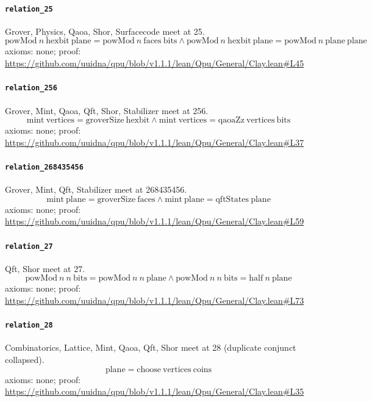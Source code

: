 \documentclass[11pt]{article}
\begin{document}
\paragraph{\texttt{relation\_25}}
Grover, Physics, Qaoa, Shor, Surfacecode meet at 25.
\[ \mathrm{powMod}\ n\ \mathrm{hexbit}\ \mathrm{plane} = \mathrm{powMod}\ n\ \mathrm{faces}\ \mathrm{bits} \land \mathrm{powMod}\ n\ \mathrm{hexbit}\ \mathrm{plane} = \mathrm{powMod}\ n\ \mathrm{plane}\ \mathrm{plane} \]
\noindent axioms: none; proof: \url{https://github.com/uuidna/qpu/blob/v1.1.1/lean/Qpu/General/Clay.lean\#L45}

\paragraph{\texttt{relation\_256}}
Grover, Mint, Qaoa, Qft, Shor, Stabilizer meet at 256.
\[ \mathrm{mint}\ \mathrm{vertices} = \mathrm{groverSize}\ \mathrm{hexbit} \land \mathrm{mint}\ \mathrm{vertices} = \mathrm{qaoaZz}\ \mathrm{vertices}\ \mathrm{bits} \]
\noindent axioms: none; proof: \url{https://github.com/uuidna/qpu/blob/v1.1.1/lean/Qpu/General/Clay.lean\#L37}

\paragraph{\texttt{relation\_268435456}}
Grover, Mint, Qft, Stabilizer meet at 268435456.
\[ \mathrm{mint}\ \mathrm{plane} = \mathrm{groverSize}\ \mathrm{faces} \land \mathrm{mint}\ \mathrm{plane} = \mathrm{qftStates}\ \mathrm{plane} \]
\noindent axioms: none; proof: \url{https://github.com/uuidna/qpu/blob/v1.1.1/lean/Qpu/General/Clay.lean\#L59}

\paragraph{\texttt{relation\_27}}
Qft, Shor meet at 27.
\[ \mathrm{powMod}\ n\ n\ \mathrm{bits} = \mathrm{powMod}\ n\ n\ \mathrm{plane} \land \mathrm{powMod}\ n\ n\ \mathrm{bits} = \mathrm{half}\ n\ \mathrm{plane} \]
\noindent axioms: none; proof: \url{https://github.com/uuidna/qpu/blob/v1.1.1/lean/Qpu/General/Clay.lean\#L73}

\paragraph{\texttt{relation\_28}}
Combinatorics, Lattice, Mint, Qaoa, Qft, Shor meet at 28 (duplicate conjunct collapsed).
\[ \mathrm{plane} = \mathrm{choose}\ \mathrm{vertices}\ \mathrm{coins} \]
\noindent axioms: none; proof: \url{https://github.com/uuidna/qpu/blob/v1.1.1/lean/Qpu/General/Clay.lean\#L35}
\end{document}
